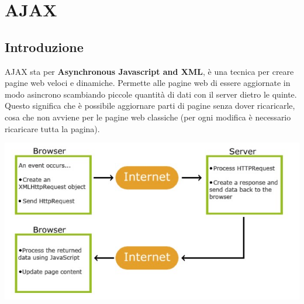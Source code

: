 \chapter{AJAX}
\section{Introduzione}
AJAX sta per \textbf{Asynchronous Javascript and XML}, è una tecnica per creare pagine web veloci e dinamiche. Permette alle pagine web di essere aggiornate in modo asincrono scambiando piccole quantità di dati con il server dietro le quinte. Questo significa che è possibile aggiornare parti di pagine senza dover ricaricarle, cosa che non avviene per le pagine web classiche (per ogni modifica è necessario ricaricare tutta la pagina). 
\begin{center}
    \includegraphics[scale=0.6]{Images/TecnologieWeb/8/AJAX.jpg}
\end{center}

